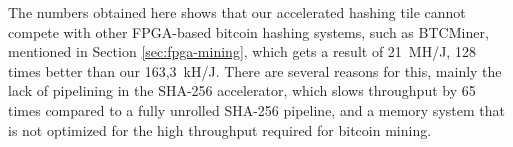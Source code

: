 The numbers obtained here shows that our accelerated hashing tile cannot compete with other FPGA-based bitcoin hashing systems,
such as BTCMiner, mentioned in Section \ref{sec:fpga-mining}, which gets a result of 21~MH/J, 128 times better than our 163,3~kH/J.
There are several reasons for this, mainly the lack of pipelining in the SHA-256 accelerator, which slows throughput by 65 times
compared to a fully unrolled SHA-256 pipeline, and a memory system that is not optimized for the high throughput required for bitcoin mining.


%



